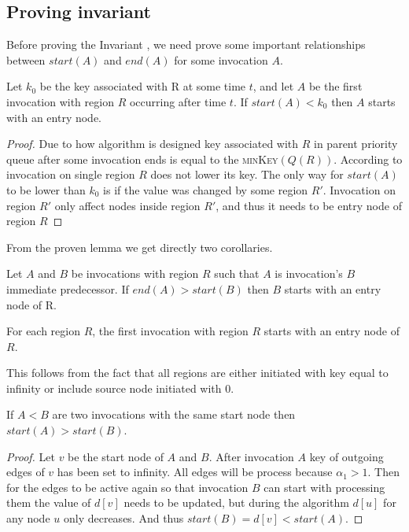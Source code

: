 \subsection{Proving invariant}

Before proving the Invariant , we need prove some important relationships between $start(A)$ and $end(A)$ for some invocation $A$.

\begin{lemma}
Let $k_0$ be the key associated with R at some time $t$, and let $A$ be the first invocation with region $R$ occurring after time $t$. If $start(A)<k_0$ then $A$ starts with an entry node.
\end{lemma}
\begin{proof}
Due to how algorithm is designed key associated with $R$ in parent priority queue after some invocation ends is equal to the \textsc{minKey}$(Q(R))$. According to   invocation on single region $R$ does not lower its key. The only way for $start(A)$ to be lower than $k_0$ is if the value was changed by some region $R'$. Invocation on region $R'$ only affect nodes inside region $R'$, and thus it needs to be entry node of region $R$
\end{proof}

From the proven lemma we get directly two corollaries.  
\begin{corollary}
\label{coroBig}
Let $A$ and $B$ be invocations with region $R$ such that $A$ is invocation's $B$ immediate predecessor. If $end(A)>start(B)$ then $B$ starts with an entry node of R.
\end{corollary}

\begin{corollary}
For each region $R$, the first invocation with region $R$ starts with an entry node of $R$.
\end{corollary}
This follows from the fact that all regions are either initiated with key equal to infinity or include source node initiated with 0.

\begin{lemma}
\label{sameStart}
If $A<B$ are two invocations with the same start node then $start(A)>start(B)$.
\end{lemma}
\begin{proof}
Let $v$ be the start node of $A$ and $B$. After invocation $A$ key of outgoing edges of $v$ has been set to infinity. All edges will be process because $\alpha_1 > 1$. Then for the edges to be active again so that invocation $B$ can start with processing them the value of $d[v]$ needs to be updated, but during the algorithm $d[u]$ for any node $u$ only decreases. And thus $start(B) = d[v] < start(A)$.
\end{proof}

